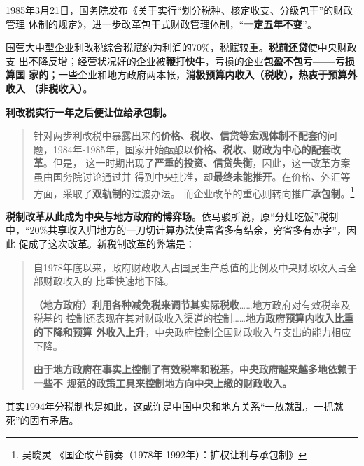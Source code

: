 

1985年3月21日，国务院发布《关于实行“划分税种、核定收支、分级包干”的财政管理
体制的规定》，进一步改革包干式财政管理体制，“\textbf{一定五年不变}”。

国营大中型企业利改税综合税赋约为利润的70\%，税赋较重。\textbf{税前还贷}使中央财政支
出不降反增；经营状况好的企业被\textbf{鞭打快牛}，亏损的企业\textbf{包盈不包亏——亏损算国
  家的}；一些企业和地方政府两本帐，\textbf{消极预算内收入（税收），热衷于预算外收入
（非税收入）}。

\textbf{利改税实行一年之后便让位给承包制。}
\begin{quotation}
  针对两步利改税中暴露出来的\textbf{价格、税收、信贷等宏观体制不配套}的问
  题，1984年-1985年，国家开始酝酿以\textbf{价格、税收、财政为中心的配套改革}。但是，
  这一时期出现了\textbf{严重的投资、信贷失衡}，因此，这一改革方案虽由国务院讨论通过并
  得到中央批准，却\textbf{最终未能推开}。在价格、外汇等方面，采取了\textbf{双轨制}的过渡办法。
  而企业改革的重心则转向推广\textbf{承包制}。\footnote{吴晓灵 《国企改革前奏（1978年-1992年）：扩权让利与承包制》}
\end{quotation}


\textbf{税制改革从此成为中央与地方政府的博弈场}。依马骏所说，原“分灶吃饭”税制
中，“20\%共享收入归地方的一刀切计算办法使富省多有结余，穷省多有赤字”，因此
促成了这次改革。新税制改革的弊端是：
\begin{quotation}
  自1978年底以来，政府财政收入占国民生产总值的比例及中央财政收入占全部财政收入的
  比重快速地下降。

  \textbf{（地方政府）利用各种减免税来调节其实际税收}……地方政府对有效税率及税基的
  控制还表现在其对财政收入渠道的控制……\textbf{地方政府预算内收入比重的下降和预算
    外收入上升}，中央政府控制全国财政收入与支出的能力相应下降。

  \textbf{由于地方政府在事实上控制了有效税率和税基，中央政府越来越多地依赖于一些不
    规范的政策工具来控制地方向中央上缴的财政收入。}\cite{majuncaigai}
\end{quotation}

其实1994年分税制也是如此，这或许是中国中央和地方关系“一放就乱，一抓就
  死”的固有矛盾。


